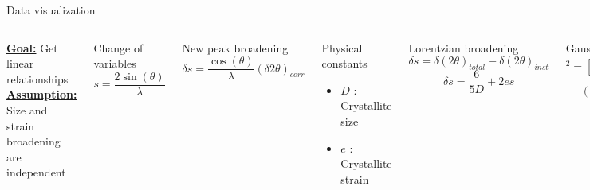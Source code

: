 \documentclass{beamer}
\begin{document}
\begin{frame}{Data visualization}
    \begin{columns}
         \underline{\textbf{Goal:}} Get linear relationships
         \underline{\textbf{Assumption:}} Size and strain broadening are independent
         \begin{block}{Change of variables}
            \begin{equation*}
                s = \frac{2 \sin(\theta)}{\lambda}
            \end{equation*}
        \end{block}
        \begin{exampleblock}{New peak broadening}
            \begin{equation*}
                \delta s = \frac{\cos(\theta)}{\lambda}(\delta 2 \theta)_{corr}
            \end{equation*}
        \end{exampleblock}
        \begin{block}{Physical constants}
            \begin{itemize}
                \item $D$ : Crystallite size
                \item $e$ : Crystallite strain
            \end{itemize}
        \end{block}
        \begin{alertblock}{Lorentzian broadening}
            \begin{equation*}
                \delta s = \delta(2\theta)_{total} - \delta(2\theta)_{inst}
            \end{equation*}
            \begin{equation*}
                \delta s = \frac{6}{5D} + 2 e s
            \end{equation*}
        \end{alertblock}
        \begin{alertblock}{Gaussian broadening}
            \begin{equation*}
                [\delta s]^2 = [\delta(2\theta)_{total}]^2 - [\delta(2\theta)_{inst}]^2
            \end{equation*}
            \begin{equation*}
                (\delta s)^2 = \left( \frac{6}{5D} \right)^2 + (2e s)^2
            \end{equation*}
        \end{alertblock}
    \end{columns}
\end{frame}
\end{document}
